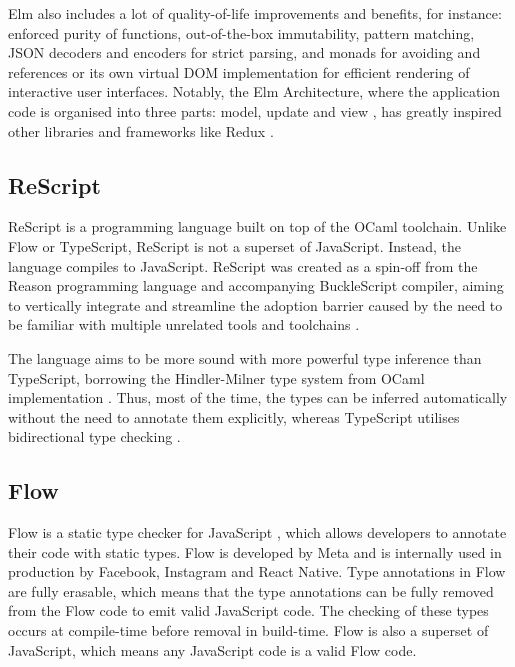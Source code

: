 Elm also includes a lot of quality-of-life improvements and benefits, for instance: enforced purity of functions, out-of-the-box immutability,  pattern matching, JSON decoders and encoders for strict parsing,  and  monads for avoiding  and  references or its own virtual DOM implementation for efficient rendering of interactive user interfaces. Notably, the Elm Architecture, where the application code is organised into three parts: model, update and view \cite{ElmArchitectureIntroduction}, has greatly inspired other libraries and frameworks like Redux \cite{PriorArtRedux2022}.

\subsection{ReScript}

ReScript is a programming language built on top of the OCaml toolchain. Unlike Flow or TypeScript, ReScript is not a superset of JavaScript. Instead, the language compiles to JavaScript. ReScript was created as a spin-off from the Reason programming language and accompanying BuckleScript compiler, aiming to vertically integrate and streamline the adoption barrier caused by the need to be familiar with multiple unrelated tools and toolchains \cite{BuckleScriptReasonRebranding}.

The language aims to be more sound with more powerful type inference than TypeScript, borrowing the Hindler-Milner type system from OCaml implementation \cite{EfficientInsightfulGeneralization, HistoryReScript2022}. Thus, most of the time, the types can be inferred automatically without the need to annotate them explicitly, whereas TypeScript utilises bidirectional type checking \cite{ReconstructingTypeScriptPart}.

\subsection{Flow}

Flow is a static type checker for JavaScript \cite{chaudhuriFastPreciseType2017, Flow2023}, which allows developers to annotate their code with static types. Flow is developed by Meta and is internally used in production by Facebook, Instagram and React Native. Type annotations in Flow are fully erasable, which means that the type annotations can be fully removed from the Flow code to emit valid JavaScript code. The checking of these types occurs at compile-time before removal in build-time. Flow is also a superset of JavaScript, which means any JavaScript code is a valid Flow code.

